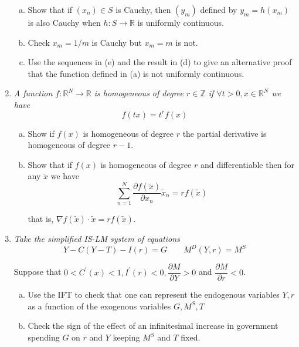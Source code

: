 \documentclass{article}
\begin{document}
\begin{enumerate}[1.]
{\begin{enumerate}[a)]
      \item Show that if $(x_n) \in S$ is Cauchy, then $(y_m)$ defined by $y_m = h(x_m)$ is also Cauchy when $h: S \to \mathbb{R}$ is uniformly continuous.

      \item Check $x_m = 1 / m$ is Cauchy but $x_m = m$ is not.

      \item Use the sequences in (e) and the result in (d) to give an alternative proof that the function defined in (a) is not uniformly continuous.
    \end{enumerate}
  }

  \item {\itshape
    A function $f: \mathbb{R}^N \to \mathbb{R}$ is homogeneous of degree $r \in \mathbb{Z}$ if $\forall t > 0, x \in \mathbb{R}^N$ we have
    \[
      f(tx) = t^r f(x)
    \]

    \begin{enumerate}[a)]
      \item Show if $f(x)$ is homogeneous of degree $r$ the partial derivative is homogeneous of degree $r - 1$.

      \item Show that if $f(x)$ is homogeneous of degree $r$ and differentiable  then for any $\widetilde{x}$ we have
        \[
          \sum^{N}_{n = 1} \dfrac{\partial f(\widetilde{x})}{\partial x_n} \widetilde{x}_n = r f(\widetilde{x})
        \]

      that is, $\nabla f(\widetilde{x}) \cdot \widetilde{x} = r f(\widetilde{x})$.\textit{}
    \end{enumerate}
  }

  \item {\itshape
    Take the simplified IS-LM system of equations
    \[
      Y - C(Y - T) - I(r) = G
      \quad\quad
      M^D(Y, r) = M^S
    \]

    Suppose that $0 < C^\prime(x) < 1, I^\prime(r) < 0, \dfrac{\partial M}{\partial Y} > 0$ and $\dfrac{\partial M}{\partial r} < 0$.
    \begin{enumerate}[a)]
      \item Use the IFT to check that one can represent the endogenous variables $Y, r$ as a function of the exogenous variables $G, M^S, T$

      \item Check the sign of the effect of an infinitesimal increase in government spending $G$ on $r$ and $Y$ keeping $M^S$ and $T$ fixed.
    \end{enumerate}
  }


\end{enumerate}
\end{document}
